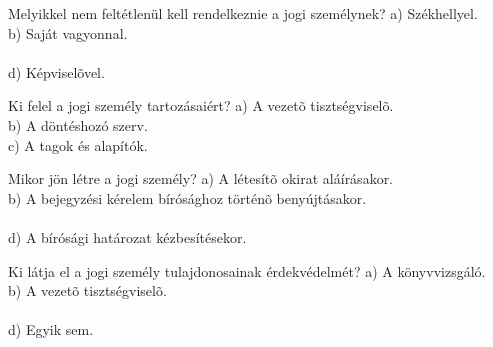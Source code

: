 \begin{frame}

\begin{tcolorbox}[title={48. Kérdés}]
Melyikkel nem feltétlenül kell rendelkeznie a jogi személynek?
\tcblower
a) Székhellyel.\\
b) Saját vagyonnal.\\
\\
d) Képviselõvel.
\end{tcolorbox}

\begin{tcolorbox}[title={49. Kérdés}]
Ki felel a jogi személy tartozásaiért?
\tcblower
a) A vezetõ tisztségviselõ.\\
b) A döntéshozó szerv.\\
c) A tagok és alapítók.\\
\end{tcolorbox}

\begin{tcolorbox}[title={50. Kérdés}]
Mikor jön létre a jogi személy?
\tcblower
a) A létesítõ okirat aláírásakor.\\
b) A bejegyzési kérelem bírósághoz történõ benyújtásakor.\\
\\
d) A bírósági határozat kézbesítésekor.
\end{tcolorbox}

\begin{tcolorbox}[title={51. Kérdés}]
Ki látja el a jogi személy tulajdonosainak érdekvédelmét?
\tcblower
a) A könyvvizsgáló.\\
b) A vezetõ tisztségviselõ.\\
\\
d) Egyik sem.
\end{tcolorbox}

\end{frame}


